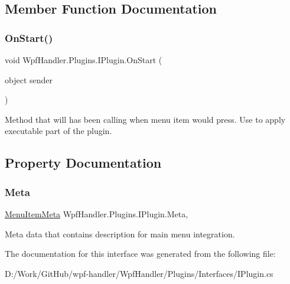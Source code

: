 \subsection{Member Function Documentation}
\mbox{\label{interface_wpf_handler_1_1_plugins_1_1_i_plugin_aabe1a8e5680ebeb37f96ffe86b6123e9}} 
\subsubsection{\texorpdfstring{On\+Start()}{OnStart()}}
{\footnotesize\ttfamily void Wpf\+Handler.\+Plugins.\+I\+Plugin.\+On\+Start (\begin{DoxyParamCaption}\item[{object}]{sender }\end{DoxyParamCaption})}



Method that will has been calling when menu item would press. Use to apply executable part of the plugin. 



\subsection{Property Documentation}
\mbox{\label{interface_wpf_handler_1_1_plugins_1_1_i_plugin_a654e20458e4e44b69c9de0be25a8d9af}} 
\subsubsection{\texorpdfstring{Meta}{Meta}}
{\footnotesize\ttfamily \mbox{\hyperlink{class_wpf_handler_1_1_plugins_1_1_menu_item_meta}{Menu\+Item\+Meta}} Wpf\+Handler.\+Plugins.\+I\+Plugin.\+Meta\hspace{0.3cm}{\ttfamily [get]}, {\ttfamily [set]}}



Meta data that contains description for main menu integration. 



The documentation for this interface was generated from the following file\+:\begin{DoxyCompactItemize}
\item 
D\+:/\+Work/\+Git\+Hub/wpf-\/handler/\+Wpf\+Handler/\+Plugins/\+Interfaces/I\+Plugin.\+cs\end{DoxyCompactItemize}
